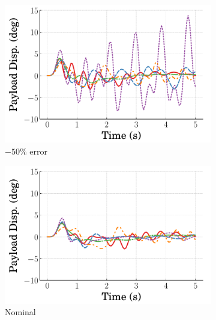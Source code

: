 \begin{figure}[tb]
    \centering
    \begin{subfigure}[b]{0.32\textwidth}
        \centering
        \includegraphics[width=\textwidth]{figures/figures_robustness/dpcrane_robustness/time_responses/0p5L1_payload.pdf}
        \caption{$-50\%$ error}
        \label{subfig_chap4:dpcrane_0p5L1_payload}
    \end{subfigure}
    \hfill
    \begin{subfigure}[b]{0.32\textwidth}
        \centering
        \includegraphics[width=\textwidth]{figures/figures_robustness/dpcrane_robustness/time_responses/1p0L1_payload.pdf}
        \caption{Nominal}
        \label{subfig_chap4:dpcrane_1p0L1_payload}
    \end{subfigure}
    \hfill
    \begin{subfigure}[b]{0.32\textwidth}
        \centering

\end{subfigure}
\end{figure}
